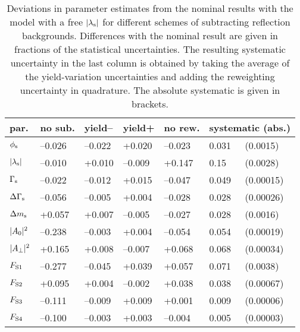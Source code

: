 \begin{table}[htbp]
  \centering
  \caption{Deviations in parameter estimates from the nominal results with the model with a free $\lamsAbs$ for different schemes of
           subtracting reflection backgrounds.
           Differences with the nominal result are given in fractions of the statistical uncertainties. The resulting systematic
           uncertainty in the last column is obtained by taking the average of the yield-variation uncertainties and adding the reweighting
           uncertainty in quadrature. The absolute systematic is given in brackets.}
  \label{tab:syst_mass_peaking_lamb_phi}
  \begin{tabular}{lllllll}
    \hline
    par.            &  no sub.    &  yield--  &  yield+   &  no rew.  &  \multicolumn{2}{l}{systematic (abs.)}  \\
    \hline
    $\phis$         &  --0.026    &  --0.022  &   +0.020  &  --0.023  &  0.031  &  (0.0015)                     \\
    $\lamsAbs$      &  --0.010    &   +0.010  &  --0.009  &   +0.147  &  0.15   &  (0.0028)                     \\
    \hline
    $\Gs$           &  --0.022    &  --0.012  &   +0.015  &  --0.047  &  0.049  &  (0.00015)                    \\
    $\DGs$          &  --0.056    &  --0.005  &   +0.004  &  --0.028  &  0.028  &  (0.00026)                    \\
    $\Dms$          &   +0.057    &   +0.007  &  --0.005  &  --0.027  &  0.028  &  (0.0016)                     \\
    \hline
    $\magzeroSq$    &  --0.238    &  --0.003  &   +0.004  &  --0.054  &  0.054  &  (0.00019)                    \\
    $\magperpSq$    &   +0.165    &   +0.008  &  --0.007  &   +0.068  &  0.068  &  (0.00034)                    \\
    $\FS[1]$        &  --0.277    &  --0.045  &   +0.039  &   +0.057  &  0.071  &  (0.0038)                     \\
    $\FS[2]$        &   +0.095    &   +0.004  &  --0.002  &   +0.038  &  0.038  &  (0.00067)                    \\
    $\FS[3]$        &  --0.111    &  --0.009  &   +0.009  &   +0.001  &  0.009  &  (0.00006)                    \\
    $\FS[4]$        &  --0.100    &  --0.003  &   +0.003  &  --0.004  &  0.005  &  (0.00003)                    \\

\end{tabular}
\end{table}
